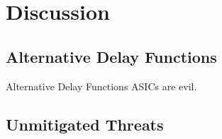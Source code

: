 \section{Discussion}

\subsection{Alternative Delay Functions}

\begin{frame}{Alternative Delay Functions}
    \centering
    ASICs are evil.
\end{frame}


\subsection{Unmitigated Threats}


